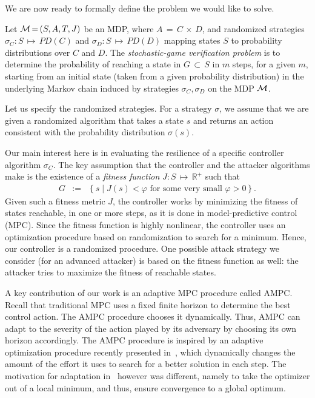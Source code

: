 We are now ready to formally define the problem we would like to solve.
\begin{definition}
Let ${\mathcal{M}}\,{=}\,(S,A,T,J)$ be an MDP, where 
$A\,{=}\,C\,{\times}\,D$, and randomized strategies
$\sigma_C: S\,{\mapsto}\,PD(C)$ and
$\sigma_D: S\,{\mapsto}\,PD(D)$ mapping states $S$ to probability distributions
over $C$ and $D$. 
%
The \emph{stochastic-game verification problem} is to
determine the probability of reaching a state in $G\,{\subset}\,S$
in $m$ steps, for a given $m$, starting from an initial state (taken from a given probability distribution) in the underlying Markov chain induced by
strategies $\sigma_C,\sigma_D$ on the MDP ${\mathcal{M}}$.
\end{definition}

Let us specify the randomized strategies. For a strategy
$\sigma$, we assume that we are
given a randomized algorithm that takes a state $s$ and
returns an action consistent with the probability distribution $\sigma(s)$.

Our main interest here is in evaluating the resilience of a 
specific controller algorithm $\sigma_C$. The key assumption that
the controller and the attacker algorithms make is 
the existence of a {\emph{fitness function}}
$J: S\,{\mapsto}\,\mathbb{R}^{+}$ such that 
\begin{eqnarray*}
G & := & \left\{ s \mid J(s) < \varphi \mbox{ for some very small $\varphi > 0$} \right\}.
\end{eqnarray*}
Given such a fitness metric $J$, the controller works by minimizing the fitness of states reachable, in one or more steps, as it is done in model-predictive control (MPC).  Since the fitness function is highly nonlinear,
the controller uses an optimization procedure based on randomization to search for a minimum. Hence, our controller is a randomized procedure. One possible attack strategy we consider (for an advanced attacker) is based on the fitness function as well: the attacker tries to maximize the fitness of reachable states. 

A key contribution of our work is an adaptive MPC procedure called AMPC. Recall that traditional MPC uses a fixed finite horizon to determine the best control action. The AMPC procedure chooses it dynamically. Thus, AMPC can adapt to the severity of the action played by its adversary by choosing its own horizon accordingly. 
The AMPC procedure is inspired by an adaptive optimization procedure recently presented in~\cite{lukina2016arxiv}, which dynamically changes the amount of the effort it uses to search for a better solution in each step.  
The motivation for adaptation in~\cite{lukina2016arxiv} however was different, namely to take the optimizer out of a local minimum, and thus, ensure convergence to a global optimum.



